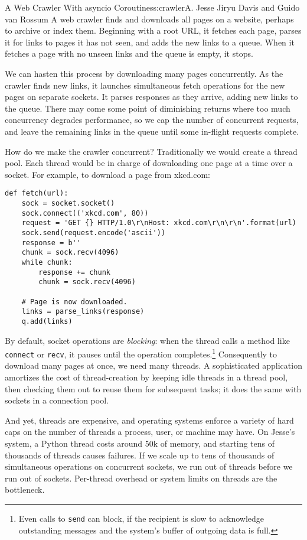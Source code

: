\begin{aosachapter}{A Web Crawler With asyncio Coroutines}{s:crawler}{A. Jesse Jiryu Davis and Guido van Rossum}
A web crawler finds and downloads all pages on a website, perhaps to
archive or index them. Beginning with a root URL, it fetches each page,
parses it for links to pages it has not seen, and adds the new links to
a queue. When it fetches a page with no unseen links and the queue is
empty, it stops.

We can hasten this process by downloading many pages concurrently. As
the crawler finds new links, it launches simultaneous fetch operations
for the new pages on separate sockets. It parses responses as they
arrive, adding new links to the queue. There may come some point of
diminishing returns where too much concurrency degrades performance, so
we cap the number of concurrent requests, and leave the remaining links
in the queue until some in-flight requests complete.

\label{the-traditional-approach}

How do we make the crawler concurrent? Traditionally we would create a
thread pool. Each thread would be in charge of downloading one page at a
time over a socket. For example, to download a page from xkcd.com:

\begin{verbatim}
def fetch(url):
    sock = socket.socket()
    sock.connect(('xkcd.com', 80))
    request = 'GET {} HTTP/1.0\r\nHost: xkcd.com\r\n\r\n'.format(url)
    sock.send(request.encode('ascii'))
    response = b''
    chunk = sock.recv(4096)
    while chunk:
        response += chunk
        chunk = sock.recv(4096)
    
    # Page is now downloaded.
    links = parse_links(response)
    q.add(links)
\end{verbatim}

By default, socket operations are \emph{blocking}: when the thread calls
a method like \texttt{connect} or \texttt{recv}, it pauses until the
operation completes.\footnote{Even calls to \texttt{send} can block, if
  the recipient is slow to acknowledge outstanding messages and the
  system's buffer of outgoing data is full.} Consequently to download
many pages at once, we need many threads. A sophisticated application
amortizes the cost of thread-creation by keeping idle threads in a
thread pool, then checking them out to reuse them for subsequent tasks;
it does the same with sockets in a connection pool.

And yet, threads are expensive, and operating systems enforce a variety
of hard caps on the number of threads a process, user, or machine may
have. On Jesse's system, a Python thread costs around 50k of memory, and
starting tens of thousands of threads causes failures. If we scale up to
tens of thousands of simultaneous operations on concurrent sockets, we
run out of threads before we run out of sockets. Per-thread overhead or
system limits on threads are the bottleneck.


\end{aosachapter}
